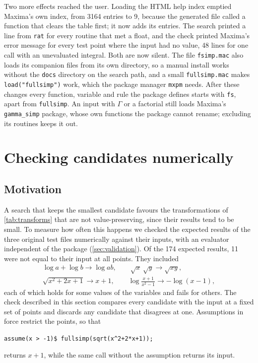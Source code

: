 \documentclass[11pt]{amsart}
\newcommand{\mx}{\lstinline[style=mx]}
\theoremstyle{definition}
\theoremstyle{remark}
\begin{document}
Two more effects reached the user. Loading the HTML help index emptied
Maxima's own index, from 3164 entries to 9, because the generated file
called a function that clears the table first; it now adds its entries.
The search printed a line from \mx|rat| for every routine that met a float,
and the check printed Maxima's error message for every test point where the
input had no value, 48 lines for one call with an unevaluated integral. Both
are now silent. The file \mx|fsimp.mac| also loads its companion files from
its own directory, so a manual install works without the \texttt{docs}
directory on the search path, and a small \mx|fullsimp.mac| makes
\mx|load("fullsimp")| work, which the package manager \texttt{mxpm} needs.
After these changes every function, variable and rule the package defines
starts with \mx|fs|, apart from \mx|fullsimp|. An input with $\Gamma$ or a
factorial still loads Maxima's \texttt{gamma\_simp} package, whose own
functions the package cannot rename; excluding its routines keeps it out.

\section{Checking candidates numerically}\label{sec:check}

\subsection{Motivation}

A search that keeps the smallest candidate favours the transformations of
\cref{tab:transforms} that are not value-preserving, since their results
tend to be small. To measure how often this happens we checked the expected
results of the three original test files numerically against their inputs,
with an evaluator independent of the package (\cref{sec:validation}). Of the
174 expected results, 11 were not equal to their input at all points. They
included
\begin{gather*}
  \log a + \log b \to \log ab, \qquad
  \sqrt{x}\,\sqrt{y} \to \sqrt{xy},\\
  \sqrt{x^2+2x+1} \to x + 1, \qquad
  \log\frac{x+1}{x^2-1} \to -\log(x-1),
\end{gather*}
each of which holds for some values of the variables and fails for others.
The check described in this section compares every candidate with the input
at a fixed set of points and discards any candidate that disagrees at one.
Assumptions in force restrict the points, so that
\begin{center}
  \mx|assume(x > -1)$ fullsimp(sqrt(x^2+2*x+1));|
\end{center}
returns $x+1$, while the same call without the assumption returns its input.
\end{document}
